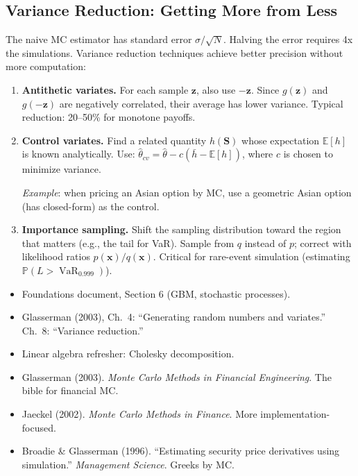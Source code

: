 \documentclass[11pt, a4paper]{article}
\newcommand{\VaR}{\operatorname{VaR}}
\newcommand{\EV}{\mathbb{E}}
\newcommand{\PV}{\mathbb{P}}
\begin{document}
\subsection{Variance Reduction: Getting More from Less}

The naive MC estimator has standard error $\sigma / \sqrt{N}$.
Halving the error requires 4x the simulations.
Variance reduction techniques achieve better precision without more computation:

\begin{enumerate}
    \item \textbf{Antithetic variates.}
    For each sample $\bm{z}$, also use $-\bm{z}$.
    Since $g(\bm{z})$ and $g(-\bm{z})$ are negatively correlated, their average has lower variance.
    Typical reduction: 20--50\% for monotone payoffs.

    \item \textbf{Control variates.}
    Find a related quantity $h(\bm{S})$ whose expectation $\EV[h]$ is known analytically.
    Use: $\hat\theta_{cv} = \hat\theta - c(\bar{h} - \EV[h])$, where $c$ is chosen to minimize variance.

    \textit{Example}: when pricing an Asian option by MC, use a geometric Asian option (has closed-form) as the control.

    \item \textbf{Importance sampling.}
    Shift the sampling distribution toward the region that matters (e.g., the tail for VaR).
    Sample from $q$ instead of $p$; correct with likelihood ratios $p(\bm{x})/q(\bm{x})$.
    Critical for rare-event simulation (estimating $\PV(L > \VaR_{0.999})$).
\end{enumerate}

\begin{prereq}
\begin{itemize}
    \item Foundations document, Section 6 (GBM, stochastic processes).
    \item Glasserman (2003), Ch.~4: ``Generating random numbers and variates.'' Ch.~8: ``Variance reduction.''
    \item Linear algebra refresher: Cholesky decomposition.
\end{itemize}
\end{prereq}

\begin{refbox}
\begin{itemize}
    \item Glasserman (2003). \emph{Monte Carlo Methods in Financial Engineering}. The bible for financial MC.
    \item Jaeckel (2002). \emph{Monte Carlo Methods in Finance}. More implementation-focused.
    \item Broadie \& Glasserman (1996). ``Estimating security price derivatives using simulation.'' \emph{Management Science}. Greeks by MC.
\end{itemize}
\end{refbox}
\end{document}
